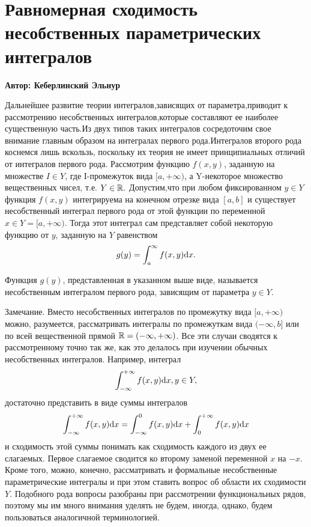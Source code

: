 \setcounter{object}{0}
\setcounter{approval}{0}
\setcounter{theorem}{0}
\setcounter{example}{0}
\chapter{Равномерная сходимость несобственных параметрических интегралов}
\centerline{\bf Автор: Кеберлинский Эльнур}\vskip 1cm


\vskip 1cm
Дальнейшее развитие теории интегралов,зависящих от параметра,приводит к рассмотрению несобственных интегралов,которые составляют ее наиболее существенную часть.Из двух типов таких интегралов сосредоточим свое внимание главным образом на интегралах первого рода.Интегралов второго рода коснемся лишь вскользь, поскольку их теория не имеет принципиальных отличий от интегралов первого рода.
\vskip 1cm
Рассмотрим функцию $f(x,y)$, заданную на множестве $I \in Y $, где I-промежуток вида $[a,+\infty)$, а Y-некоторое множество вещественных чисел, т.е. $ Y \in \mathbb R.$ Допустим,что при любом фиксированном $y \in Y $ функция $f(x,y) $ интегрируема на конечном отрезке вида $ [a,b] $ и существует несобственный интеграл первого рода от этой функции по переменной $ x \in Y=[a,+\infty)$. Тогда этот интеграл сам представляет собой некоторую функцию от $y$, заданную на $ Y$ равенством
$$  g(y)=\int_a^\infty {f(x,y){\rm d}x}.$$

\begin{object}
Функция $g(y)$, представленная в указанном выше виде, называется несобственным интегралом первого рода, зависящим от параметра $y \in Y$.
\end{object}

Замечание. Вместо несобственных интегралов по промежутку вида $[a,+\infty)$ можно,
разумеется,
рассматривать интегралы по промежуткам вида $(-\infty,b]$ или по всей вещественной прямой $\mathbb R =(-\infty,+\infty)$. 
Все эти случаи сводятся к рассмотренному точно так же,
как это делалось при изучении обычных несобственных интегралов. 
Например, интеграл
$$\int_{-\infty}^{+\infty} {f(x,y) {\rm d}x},y \in Y,$$
достаточно представить в виде суммы интегралов
$$\int_{-\infty}^{+\infty} {f(x,y) {\rm d}x}=\int_{-\infty}^0 {f(x,y){\rm d}x} + \int_0^{+\infty} {f(x,y){\rm d}x}$$
и сходимость этой суммы понимать как сходимость каждого из двух ее слагаемых. Первое слагаемое сводится ко второму заменой переменной $x$ на $-x$. Кроме того, можно, конечно, рассматривать и формальные несобственные параметрические интегралы и при этом ставить вопрос об области их сходимости $Y$. Подобного рода вопросы разобраны при рассмотрении функциональных рядов, поэтому мы им много внимания уделять не будем, иногда, однако, будем пользоваться аналогичной терминологией.

